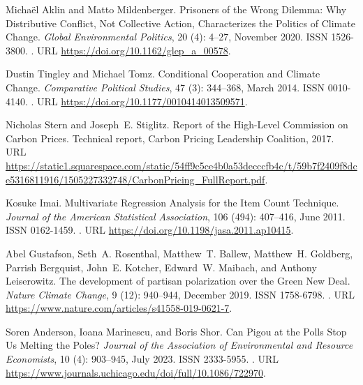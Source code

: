 \documentclass[12pt,english]{article}
\begin{document}
\begin{thebibliography}{55}
  Micha{\"e}l Aklin and Matto Mildenberger.
  \newblock Prisoners of the {{Wrong Dilemma}}: {{Why Distributive Conflict}},
    {{Not Collective Action}}, {{Characterizes}} the {{Politics}} of {{Climate
    Change}}.
  \newblock \emph{Global Environmental Politics}, 20 (4):
    4--27, November 2020.
  \newblock ISSN 1526-3800.
  \newblock {}.
  \newblock URL \url{https://doi.org/10.1162/glep\_a\_00578}.
  
  Dustin Tingley and Michael Tomz.
  \newblock Conditional {{Cooperation}} and {{Climate Change}}.
  \newblock \emph{Comparative Political Studies}, 47 (3):
    344--368, March 2014.
  \newblock ISSN 0010-4140.
  \newblock {}.
  \newblock URL \url{https://doi.org/10.1177/0010414013509571}.
  
  Nicholas Stern and Joseph~E. Stiglitz.
  \newblock Report of the {{High-Level Commission}} on {{Carbon Prices}}.
  \newblock Technical report, Carbon Pricing Leadership Coalition, 2017.
  \newblock URL
    \url{https://static1.squarespace.com/static/54ff9c5ce4b0a53decccfb4c/t/59b7f2409f8dce5316811916/1505227332748/CarbonPricing\_FullReport.pdf}.
  
  Kosuke Imai.
  \newblock Multivariate {{Regression Analysis}} for the {{Item Count
    Technique}}.
  \newblock \emph{Journal of the American Statistical Association}, 106
    (494): 407--416, June 2011.
  \newblock ISSN 0162-1459.
  \newblock {}.
  \newblock URL \url{https://doi.org/10.1198/jasa.2011.ap10415}.
  
  Abel Gustafson, Seth~A. Rosenthal, Matthew~T. Ballew, Matthew~H. Goldberg,
    Parrish Bergquist, John~E. Kotcher, Edward~W. Maibach, and Anthony
    Leiserowitz.
  \newblock The development of partisan polarization over the {{Green New Deal}}.
  \newblock \emph{Nature Climate Change}, 9 (12): 940--944,
    December 2019.
  \newblock ISSN 1758-6798.
  \newblock {}.
  \newblock URL \url{https://www.nature.com/articles/s41558-019-0621-7}.
  
  Soren Anderson, Ioana Marinescu, and Boris Shor.
  \newblock Can {{Pigou}} at the {{Polls Stop Us Melting}} the {{Poles}}?
  \newblock \emph{Journal of the Association of Environmental and Resource
    Economists}, 10 (4): 903--945, July 2023.
  \newblock ISSN 2333-5955.
  \newblock {}.
  \newblock URL \url{https://www.journals.uchicago.edu/doi/full/10.1086/722970}.
  

\end{thebibliography}
\end{document}
